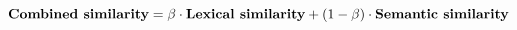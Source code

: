\begin{equation}
  \text{\textbf{Combined similarity}} =
    \beta\cdot\text{\textbf{Lexical similarity}} +
    (1 - \beta)\cdot\text{\textbf{Semantic similarity}}
\end{equation}
